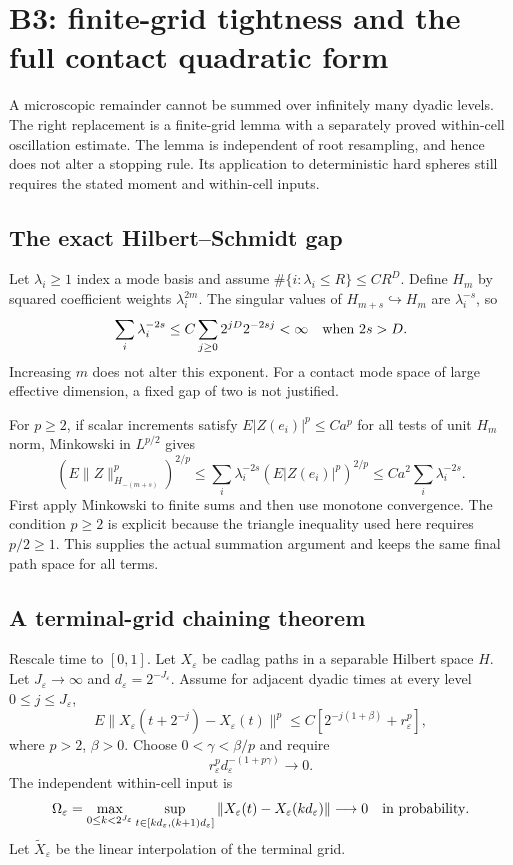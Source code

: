 \section{B3: finite-grid tightness and the full contact quadratic form}
\label{sec:r33-b3}

A microscopic remainder cannot be summed over infinitely many dyadic levels. The right replacement is a finite-grid lemma with a separately proved within-cell oscillation estimate. The lemma is independent of root resampling, and hence does not alter a stopping rule. Its application to deterministic hard spheres still requires the stated moment and within-cell inputs.

\subsection{The exact Hilbert--Schmidt gap}
Let $\lambda_i\ge1$ index a mode basis and assume $\#\{i:\lambda_i\le R\}\le CR^D$. Define $H_m$ by squared coefficient weights $\lambda_i^{2m}$. The singular values of $H_{m+s}\hookrightarrow H_m$ are $\lambda_i^{-s}$, so
\[
 \sum_i\lambda_i^{-2s}
 \le C\sum_{j\ge0}2^{jD}2^{-2sj}<\infty\quad\hbox{when }2s>D.
\]
Increasing $m$ does not alter this exponent. For a contact mode space of large effective dimension, a fixed gap of two is not justified.

For $p\ge2$, if scalar increments satisfy $E|Z(e_i)|^p\le C a^p$ for all tests of unit $H_m$ norm, Minkowski in $L^{p/2}$ gives
\[
 (E\|Z\|_{H_{-(m+s)}}^p)^{2/p}
 \le\sum_i\lambda_i^{-2s}(E|Z(e_i)|^p)^{2/p}
 \le C a^2\sum_i\lambda_i^{-2s}.
\]
First apply Minkowski to finite sums and then use monotone convergence. The condition $p\ge2$ is explicit because the triangle inequality used here requires $p/2\ge1$. This supplies the actual summation argument and keeps the same final path space for all terms.

\subsection{A terminal-grid chaining theorem}
Rescale time to $[0,1]$. Let $X_\varepsilon$ be cadlag paths in a separable Hilbert space $H$. Let $J_\varepsilon\to\infty$ and $d_\varepsilon=2^{-J_\varepsilon}$. Assume for adjacent dyadic times at every level $0\le j\le J_\varepsilon$,
\begin{equation}\label{eq:r33-b3-moment}
 E\|X_\varepsilon(t+2^{-j})-X_\varepsilon(t)\|^p
 \le C[2^{-j(1+\beta)}+r_\varepsilon^p],
\end{equation}
where $p>2$, $\beta>0$. Choose $0<\gamma<\beta/p$ and require
\begin{equation}\label{eq:r33-b3-budget}
 r_\varepsilon^p d_\varepsilon^{-(1+p\gamma)}\longrightarrow0.
\end{equation}
The independent within-cell input is
\begin{equation}\label{eq:r33-b3-cell}
 \Omega_\varepsilon=
 \max_{0\le k<2^{J_\varepsilon}}
 \sup_{t\in[kd_\varepsilon,(k+1)d_\varepsilon]}
 \|X_\varepsilon(t)-X_\varepsilon(kd_\varepsilon)\|
 \longrightarrow0\quad\hbox{in probability}.
\end{equation}
Let $\widetilde X_\varepsilon$ be the linear interpolation of the terminal grid.

